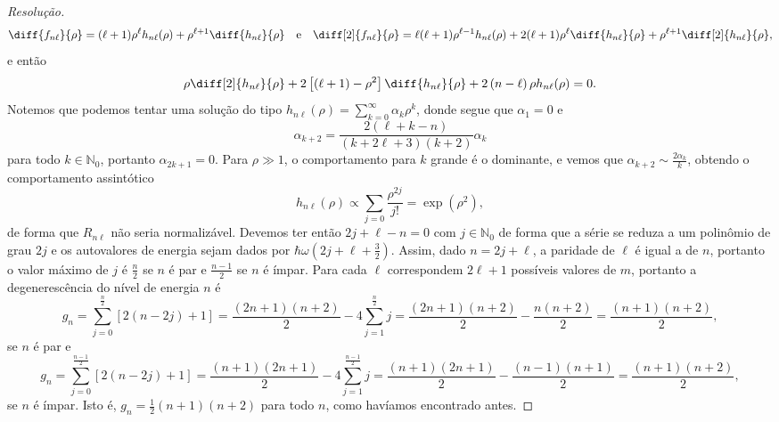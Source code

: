 \begin{proof}[Resolução]
    \begin{equation*}
        \diff{f_{n\ell}}{\rho} = (\ell+1) \rho^\ell h_{n\ell}(\rho) + \rho^{\ell + 1}\diff{h_{n\ell}}{\rho}\quad\text{e}\quad
        \diff[2]{f_{n\ell}}{\rho} = \ell(\ell+1) \rho^{\ell-1} h_{n\ell}(\rho) + 2(\ell + 1)\rho^{\ell}\diff{h_{n\ell}}{\rho} + \rho^{\ell + 1}\diff[2]{h_{n\ell}}{\rho},
    \end{equation*}
    e então
    \begin{equation*}
        \rho\diff[2]{h_{n\ell}}{\rho} + 2\left[(\ell + 1) - \rho^{2}\right]\diff{h_{n\ell}}{\rho} + 2\left(n  - \ell\right)\rho h_{n\ell}(\rho) = 0.
    \end{equation*}
    Notemos que podemos tentar uma solução do tipo \(h_{n\ell}(\rho) = \sum_{k = 0}^\infty \alpha_k \rho^{k}\), donde segue que \(\alpha_1 = 0\) e
    \begin{equation*}
        \alpha_{k+2} = \frac{2(\ell + k - n)}{(k + 2\ell + 3)(k + 2)}\alpha_{k}
    \end{equation*}
    para todo \(k \in \mathbb{N}_0\), portanto \(\alpha_{2k + 1} = 0.\) Para \(\rho \gg 1\), o comportamento para \(k\) grande é o dominante, e vemos que \(\alpha_{k+2} \sim \frac{2\alpha_k}{k}\), obtendo o comportamento assintótico
    \begin{equation*}
        h_{n\ell}(\rho) \propto \sum_{j = 0} \frac{\rho^{2j}}{j!} = \exp(\rho^2),
    \end{equation*}
    de forma que \(R_{n\ell}\) não seria normalizável. Devemos ter então \(2j + \ell - n = 0\) com \(j\in \mathbb{N}_0\) de forma que a série se reduza a um polinômio de grau \(2j\) e os autovalores de energia sejam dados por \(\hbar \omega \left(2j + \ell + \frac32\right)\). Assim,
    dado \(n = 2j + \ell\), a paridade de \(\ell\) é igual a de \(n\), portanto o valor máximo de \(j\) é \(\frac{n}{2}\) se \(n\) é par e \(\frac{n - 1}{2}\) se \(n\) é ímpar. Para cada \(\ell\) correspondem \(2\ell + 1\) possíveis valores de \(m\), portanto a degenerescência do nível de energia \(n\) é
    \begin{equation*}
        g_{n} = \sum_{j = 0}^{\frac{n}{2}} [2(n - 2j) + 1] = \frac{(2n + 1)(n + 2)}{2} - 4\sum_{j=1}^{\frac{n}{2}} j = \frac{(2n + 1)(n+2)}{2} - \frac{n(n+2)}{2} = \frac{(n+1)(n+2)}{2},
    \end{equation*}
    se \(n\) é par e
    \begin{equation*}
        g_{n} = \sum_{j = 0}^{\frac{n - 1}{2}} [2(n-2j) + 1] = \frac{(n+1)(2n+1)}{2} - 4 \sum_{j=1}^{\frac{n-1}{2}} j = \frac{(n+1)(2n+1)}{2} - \frac{(n-1)(n+1)}{2} = \frac{(n+1)(n+2)}{2},
    \end{equation*}
    se \(n\) é ímpar. Isto é, \(g_n = \frac12 (n+1)(n+2)\) para todo \(n\), como havíamos encontrado antes.
\end{proof}
